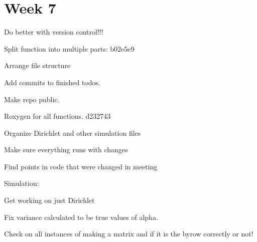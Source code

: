 \documentclass[10pt]{article}
\newcommand{\cmark}{\ding{51}}%
\newcommand{\done}{\rlap{$\square$}{\raisebox{2pt}{\large\hspace{1pt}\cmark}}%
\hspace{-2.5pt}}
\theoremstyle{definition}
\begin{document}
\section{Week 7}
\begin{todolist}
  \item[\done] Do better with version control!!!
  \item[\done] Split function into multiple parts: b02e5e9
  \item[\done] Arrange file structure
  \item[\done] Add commits to finished todos.
  \item[\done] Make repo public.
  \item[\done] Roxygen for all functions. d232743
  \item[\done] Organize Dirichlet and other simulation files
  \item Make sure everything runs with changes
  \item Find points in code that were changed in meeting
  \item Simulation:
  \item Get working on just Dirichlet
  \item Fix variance calculated to be true values of alpha.
  \item Check on all instances of making a matrix and if it is the byrow correctly or not!
\end{todolist}
\end{document}
